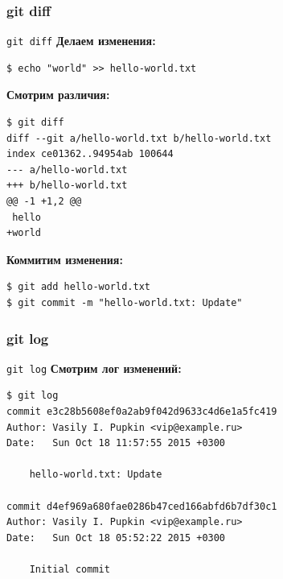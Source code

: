 \documentclass[presentation]{beamer}
\begin{document}


\subsubsection{git diff}

\begin{frame}[fragile]{\texttt{git diff}}
  \textbf{Делаем изменения:}
\begin{verbatim}
$ echo "world" >> hello-world.txt
\end{verbatim}
  \textbf{Смотрим различия:}
\begin{verbatim}
$ git diff
diff --git a/hello-world.txt b/hello-world.txt
index ce01362..94954ab 100644
--- a/hello-world.txt
+++ b/hello-world.txt
@@ -1 +1,2 @@
 hello
+world
\end{verbatim}
  \textbf{Коммитим изменения:}
\begin{verbatim}
$ git add hello-world.txt
$ git commit -m "hello-world.txt: Update"
\end{verbatim}
\end{frame}



\subsubsection{git log}

\begin{frame}[fragile]{\texttt{git log}}
  \textbf{Смотрим лог изменений:}
\begin{verbatim}
$ git log
commit e3c28b5608ef0a2ab9f042d9633c4d6e1a5fc419
Author: Vasily I. Pupkin <vip@example.ru>
Date:   Sun Oct 18 11:57:55 2015 +0300

    hello-world.txt: Update

commit d4ef969a680fae0286b47ced166abfd6b7df30c1
Author: Vasily I. Pupkin <vip@example.ru>
Date:   Sun Oct 18 05:52:22 2015 +0300

    Initial commit
\end{verbatim}
\end{frame}
\end{document}
